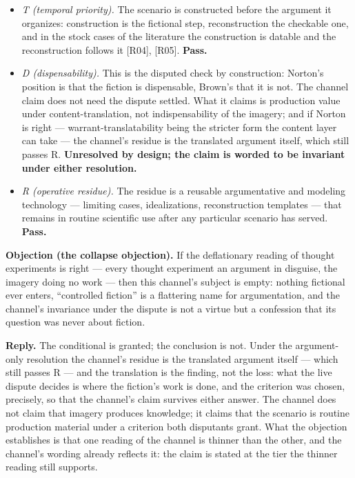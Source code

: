 \documentclass[11pt,a4paper]{article}
\begin{document}
\begin{itemize}[leftmargin=1.6em,itemsep=2pt,parsep=0pt,topsep=3pt]
\item \textit{T (temporal priority).} The scenario is constructed before the argument it organizes: construction is the fictional step, reconstruction the checkable one, and in the stock cases of the literature the construction is datable and the reconstruction follows it [R04], [R05]. \textbf{Pass.}
\item \textit{D (dispensability).} This is the disputed check by construction: Norton's position is that the fiction is dispensable, Brown's that it is not. The channel claim does not need the dispute settled. What it claims is production value under content-translation, not indispensability of the imagery; and if Norton is right — warrant-translatability being the stricter form the content layer can take — the channel's residue is the translated argument itself, which still passes R. \textbf{Unresolved by design; the claim is worded to be invariant under either resolution.}
\item \textit{R (operative residue).} The residue is a reusable argumentative and modeling technology — limiting cases, idealizations, reconstruction templates — that remains in routine scientific use after any particular scenario has served. \textbf{Pass.}
\end{itemize}

\textbf{Objection (the collapse objection).} If the deflationary reading of thought experiments is right — every thought experiment an argument in disguise, the imagery doing no work — then this channel's subject is empty: nothing fictional ever enters, ``controlled fiction'' is a flattering name for argumentation, and the channel's invariance under the dispute is not a virtue but a confession that its question was never about fiction.

\textbf{Reply.} The conditional is granted; the conclusion is not. Under the argument-only resolution the channel's residue is the translated argument itself — which still passes R — and the translation is the finding, not the loss: what the live dispute decides is where the fiction's work is done, and the criterion was chosen, precisely, so that the channel's claim survives either answer. The channel does not claim that imagery produces knowledge; it claims that the scenario is routine production material under a criterion both disputants grant. What the objection establishes is that one reading of the channel is thinner than the other, and the channel's wording already reflects it: the claim is stated at the tier the thinner reading still supports.
\end{document}
